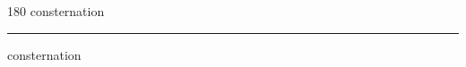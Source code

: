 
\begin{frame}
\begin{center}
\begin{turn}{180}
{\fontsize{2.5cm}{1em}\selectfont consternation}
\end{turn}
\vspace{1em}\par  
\hrule
\vspace{1em}\par  
{\fontsize{2.5cm}{1em}\selectfont consternation}
\end{center}
\end{frame}
